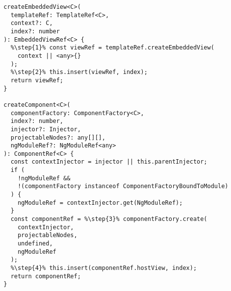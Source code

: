 \begin{verbatim}
  createEmbeddedView<C>(
    templateRef: TemplateRef<C>,
    context?: C,
    index?: number
  ): EmbeddedViewRef<C> {
    %\step{1}% const viewRef = templateRef.createEmbeddedView(
      context || <any>{}
    );
    %\step{2}% this.insert(viewRef, index);
    return viewRef;
  }

  createComponent<C>(
    componentFactory: ComponentFactory<C>,
    index?: number,
    injector?: Injector,
    projectableNodes?: any[][],
    ngModuleRef?: NgModuleRef<any>
  ): ComponentRef<C> {
    const contextInjector = injector || this.parentInjector;
    if (
      !ngModuleRef &&
      !(componentFactory instanceof ComponentFactoryBoundToModule)
    ) {
      ngModuleRef = contextInjector.get(NgModuleRef);
    }
    const componentRef = %\step{3}% componentFactory.create(
      contextInjector,
      projectableNodes,
      undefined,
      ngModuleRef
    );
    %\step{4}% this.insert(componentRef.hostView, index);
    return componentRef;
  }
\end{verbatim}

